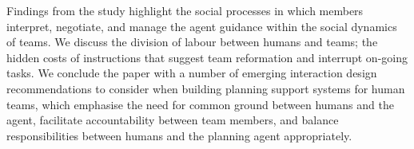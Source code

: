 Findings from the study highlight the social processes in which members interpret, negotiate, and manage the agent guidance within the social dynamics of teams. We discuss the division of labour between humans and teams; the hidden costs of instructions that suggest team reformation and interrupt on-going tasks. We conclude the paper with a number of emerging interaction design recommendations to consider when building planning support systems for human teams, which emphasise the need for common ground between humans and the agent, facilitate accountability between team members, and balance responsibilities between humans and the planning agent appropriately.\\




